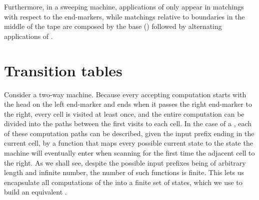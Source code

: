 Furthermore, in a sweeping machine, applications of  only appear in matchings with respect to the end-markers, while matchings relative to boundaries in the middle of the tape are composed by the base () followed by alternating applications of .



\section{Transition tables}\label{sec:transtab2DFA}
Consider a two-way machine.
Because every accepting computation starts with the head on the left end-marker and ends when it passes the right end-marker to the right, every cell is visited at least once, and the entire computation can be divided into the paths between the first visits to each cell.
In the case of a \TDFA, each of these computation paths can be described, given the input prefix ending in the current cell, by a function that maps every possible current state to the state the machine will eventually enter when scanning for the first time the adjacent cell to the right.
As we shall see, despite the possible input prefixes being of arbitrary length and infinite number, the number of such functions is finite.
This lets us encapsulate all computations of the \TDFA into a finite set of states, which we use to build an equivalent \ODFA.

